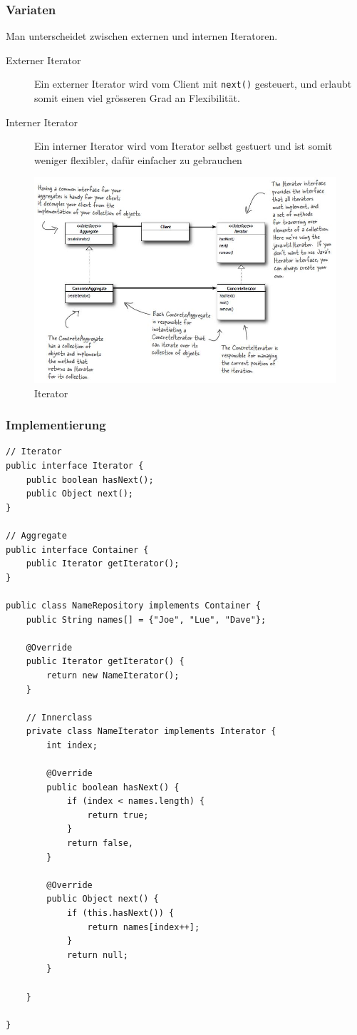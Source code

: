 \subsubsection{Variaten}
Man unterscheidet zwischen externen und internen Iteratoren. 
\begin{description}
	\item[Externer Iterator] Ein externer Iterator wird vom Client mit \lstinline|next()| gesteuert, und erlaubt somit einen viel grösseren Grad an Flexibilität.
	\item[Interner Iterator] Ein interner Iterator wird vom Iterator selbst gestuert und ist somit weniger flexibler, dafür einfacher zu gebrauchen
\end{description}

\begin{figure}[h]
	\centering
	\includegraphics[width=0.9\linewidth]{images/iterator_pattern}
	\caption{Iterator}
	\label{fig:iteratorpattern}
\end{figure}

\clearpage

\subsubsection{Implementierung}
\begin{lstlisting}[caption=Iterator]
// Iterator
public interface Iterator {
	public boolean hasNext();
	public Object next();
}

// Aggregate
public interface Container {
	public Iterator getIterator();
}

public class NameRepository implements Container {
	public String names[] = {"Joe", "Lue", "Dave"};
	
	@Override
	public Iterator getIterator() {
		return new NameIterator();	
	}
	
	// Innerclass
	private class NameIterator implements Interator {
		int index;
		
		@Override
		public boolean hasNext() {
			if (index < names.length) {
				return true;
			}
			return false,
		}
		
		@Override
		public Object next() {
			if (this.hasNext()) {
				return names[index++];
			}
			return null;
		}
	
	}
	
}
\end{lstlisting}

